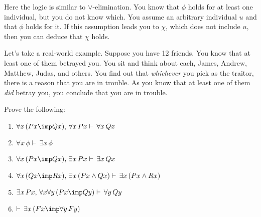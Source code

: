 \documentclass[11pt]{article}
\begin{document}
{Here the logic is similar to $\lor$-elimination. You know that $\phi$ holds for at least one individual, but you do not know which. You assume an arbitrary individual $u$ and that $\phi$ holds for it. If this assumption leads you to $\chi$, which does not include $u$, then you can deduce that $\chi$ holds. 

Let's take a real-world example. Suppose you have 12 friends. You know that at least one of them betrayed you. You sit and think about each, James, Andrew, Matthew, Judas, and others. You find out that \emph{whichever} you pick as the traitor, there is a reason that you are in trouble. As you know that at least one of them \emph{did} betray you, you conclude that you are in trouble.  

\newpage
\begin{uexercise}
Prove the following:
\begin{enumerate}
\item $\forall x\,(Px \imp Qx),\,\forall x\,Px\vdash\, \forall x\, Qx$
\item $\forall x\, \phi \vdash\, \exists x\, \phi$
\item $\forall x\, (Px \imp Qx),\,\exists x\, Px \vdash\, \exists x\, Qx$  
\item $\forall x\, (Qx \imp Rx),\,\exists x\, (Px \land Qx) \vdash\, \exists x\, (Px \land Rx)$  
\item $\exists x\, Px,\, \forall x\forall y\,(Px\imp Qy) \vdash\, \forall y\, Qy$
\item  $\vdash\,\exists x\, (Fx \imp \forall y\, Fy)$
\end{enumerate}
\end{uexercise}
}


% 
% 
\end{document}
